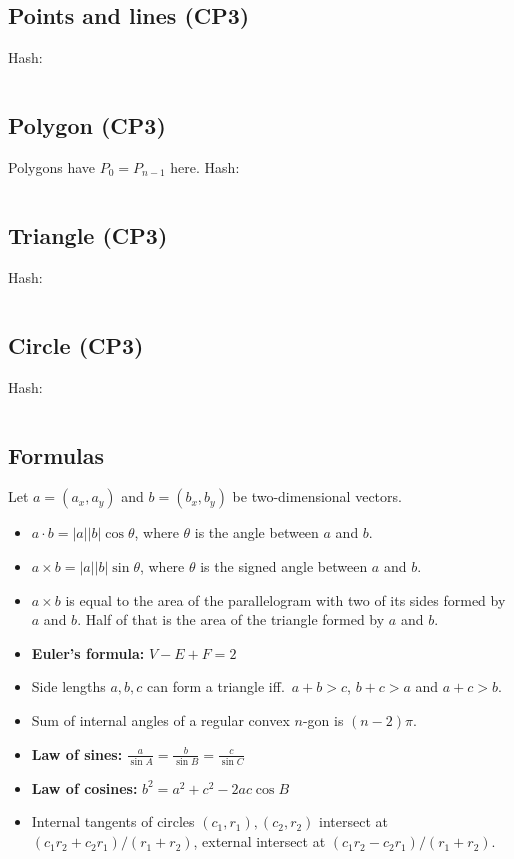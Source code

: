 \documentclass[9pt,a4paper,landscape,oneside]{amsart}
\newcommand{\mintedstyle}[2]{\inputminted{#1}{code/#2}}
\newcommand{\code}[1]{ Hash: 
\mintedstyle{cpp}{#1}}
\newenvironment{myitemize}
{\begin{itemize}[leftmargin=.3cm]
	\setlength{\itemsep}{0pt}
	\setlength{\parskip}{0pt}
	\setlength{\parsep}{0pt}     }
{ \end{itemize}                  }
\begin{document}
\begin{multicols*}{3}
\subsection{Points and lines (CP3)}
\code{geometry/CP/points_lines.cpp}
\subsection{Polygon (CP3)}
Polygons have $P_0 = P_{n-1}$ here.
\code{geometry/CP/polygon.cpp}
\subsection{Triangle (CP3)}
\code{geometry/CP/triangles.cpp}
\subsection{Circle (CP3)}
\code{geometry/CP/circles.cpp}

\subsection{Formulas}
Let $a = (a_x, a_y)$ and $b = (b_x, b_y)$ be two-dimensional vectors.
\begin{myitemize}
	\item $a\cdot b = |a||b|\cos{\theta}$, where $\theta$ is the angle
		between $a$ and $b$.
	\item $a\times b = |a||b|\sin{\theta}$, where $\theta$ is the
		signed angle between $a$ and $b$.
	\item $a\times b$ is equal to the area of the parallelogram with
		two of its sides formed by $a$ and $b$. Half of that is the
		area of the triangle formed by $a$ and $b$.
	\item \textbf{Euler's formula:} $V - E + F = 2$
	\item Side lengths $a,b,c$ can form a triangle iff.\ $a+b>c$, $b+c>a$ and $a+c>b$.
	\item Sum of internal angles of a regular convex $n$-gon is $(n-2)\pi$.
	\item \textbf{Law of sines:} $\frac{a}{\sin A} = \frac{b}{\sin B} = \frac{c}{\sin C}$
	\item \textbf{Law of cosines:} $b^2 = a^2 + c^2 - 2ac\cos B$
	\item Internal tangents of circles $(c_1,r_1), (c_2,r_2)$ intersect at $(c_1r_2+c_2r_1)/(r_1+r_2)$, external intersect at $(c_1r_2-c_2r_1)/(r_1+r_2)$.
\end{myitemize}


\end{multicols*}
\end{document}
